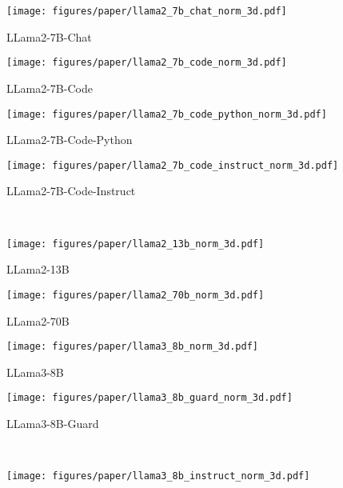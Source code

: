 \begin{figure*}[!t]
    \centering
    \begin{subfigure}[t]{0.23\textwidth}
        \texttt{[image: figures/paper/llama2\_7b\_chat\_norm\_3d.pdf]}
        \caption{LLama2-7B-Chat}\label{fig:llama2_7b_chat_norm_3d}
    \end{subfigure}
    \begin{subfigure}[t]{0.23\textwidth}
        \texttt{[image: figures/paper/llama2\_7b\_code\_norm\_3d.pdf]}
        \caption{LLama2-7B-Code}\label{fig:llama2_7b_code_norm_3d}
    \end{subfigure}
    \begin{subfigure}[t]{0.23\textwidth}
        \texttt{[image: figures/paper/llama2\_7b\_code\_python\_norm\_3d.pdf]}
        \caption{LLama2-7B-Code-Python}\label{fig:llama2_7b_code_python_norm_3d}
    \end{subfigure}
    \begin{subfigure}[t]{0.23\textwidth}
        \texttt{[image: figures/paper/llama2\_7b\_code\_instruct\_norm\_3d.pdf]}
        \caption{LLama2-7B-Code-Instruct}\label{fig:llama2_7b_code_instruct_norm_3d}
    \end{subfigure}\\
    \begin{subfigure}[t]{0.23\textwidth}
        \texttt{[image: figures/paper/llama2\_13b\_norm\_3d.pdf]}
        \caption{LLama2-13B}\label{fig:llama2_13b_norm_3d}
    \end{subfigure}
    \begin{subfigure}[t]{0.23\textwidth}
        \texttt{[image: figures/paper/llama2\_70b\_norm\_3d.pdf]}
        \caption{LLama2-70B}\label{fig:llama2_70b_norm_3d}
    \end{subfigure}
    \begin{subfigure}[t]{0.23\textwidth}
        \texttt{[image: figures/paper/llama3\_8b\_norm\_3d.pdf]}
        \caption{LLama3-8B}\label{fig:llama3_8b_norm_3d}
    \end{subfigure}
    \begin{subfigure}[t]{0.23\textwidth}
        \texttt{[image: figures/paper/llama3\_8b\_guard\_norm\_3d.pdf]}
        \caption{LLama3-8B-Guard}\label{fig:llama3_8b_guard_norm_3d}
    \end{subfigure}\\
    \begin{subfigure}[t]{0.23\textwidth}
        \texttt{[image: figures/paper/llama3\_8b\_instruct\_norm\_3d.pdf]}

\end{subfigure}
\end{figure*}
